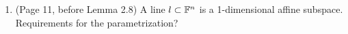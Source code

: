 \documentclass[a4paper, 10pt]{article}
\begin{document}
\begin{enumerate} [1.]
\item (Page 11, before Lemma 2.8) A line $l \subset \mathbb{F}^n$ is a 1-dimensional affine subspace. Requirements for the parametrization?
\end{enumerate}
\end{document}
